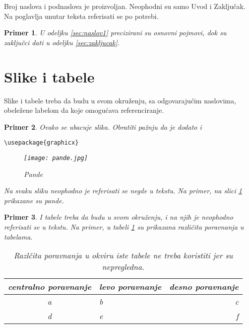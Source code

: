 \documentclass[a4paper]{article}
\newtheorem{primer}{Primer}[section]
\begin{document}
{Broj naslova i podnaslova je proizvoljan. Neophodni su samo Uvod i Zaključak. Na poglavlja unutar teksta referisati se po potrebi. 
\begin{primer}
U odeljku \ref{sec:naslov1} precizirani su osnovni pojmovi, dok su zaključci dati u odeljku \ref{sec:zakljucak}.
\end{primer}




\section{Slike i tabele}
\label{slike_i_tabele}

Slike i tabele treba da budu u svom okruženju, sa odgovarajućim naslovima, obeležene labelom da koje omogućava referenciranje. 

\begin{primer} Ovako se ubacuje slika. Obratiti pažnju da je dodato i 
\begin{verbatim}
\usepackage{graphicx}
\end{verbatim}

\begin{figure}[h!]
\begin{center}
\texttt{[image: pande.jpg]}
\end{center}
\caption{Pande}
\label{fig:pande}
\end{figure}

Na svaku sliku neophodno je referisati se negde u tekstu. Na primer, na slici \ref{fig:pande} prikazane su pande. 
\end{primer}

\begin{primer} I tabele treba da budu u svom okruženju, i na njih je neophodno referisati se u tekstu. Na primer, u tabeli \ref{tab:tabela1} su prikazana različita poravnanja u tabelama.

\begin{table}[h!]
\begin{center}
\caption{Razlčita poravnanja u okviru iste tabele ne treba koristiti jer su nepregledna.}
\begin{tabular}{|c|l|r|} \hline
centralno poravnanje& levo poravnanje& desno poravnanje\\ \hline
a &b&c\\ \hline
d &e&f\\ \hline
\end{tabular}
\label{tab:tabela1}
\end{center}
\end{table}


\end{primer}}
\end{document}
